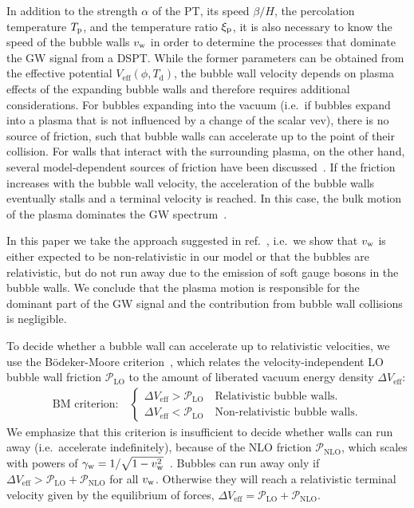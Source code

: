 In addition to the strength $\alpha$ of the \ac{PT}, its speed $\beta/H$, the percolation temperature $T_{\text{p}}$, and the temperature ratio $\xi_{\text{p}}$, it is also necessary to know the speed of the bubble walls $v_\mathrm{w}$ in order to determine the processes that dominate the \ac{GW} signal from a \ac{DSPT}. While the former parameters can be obtained from the effective potential $V_\text{eff}(\phi, T_\text{d})$, the bubble wall velocity depends on plasma effects of the expanding bubble walls and therefore requires additional considerations. For bubbles expanding into the vacuum (i.e.~if bubbles expand into a plasma that is not influenced by a change of the scalar \ac{vev}), there is no source of friction, such that bubble walls can accelerate up to the point of  their collision. For walls that interact with the surrounding plasma, on the other hand, several model-dependent sources of friction have been discussed~\cite{Liu:1992tn, Bodeker:2009qy, Bodeker:2017cim, Azatov:2020ufh, GarciaGarcia:2022yqb}. If the friction increases with the bubble wall velocity, the acceleration of the bubble walls eventually stalls and a terminal velocity
is reached. In this case, the bulk motion of the plasma dominates the \ac{GW} spectrum~\cite{Azatov:2023xem}.

In this paper we take the approach suggested in ref.~\cite{Vanvlasselaer:2022fqf}, i.e.~we show that $v_\mathrm{w}$ is either expected to be non-relativistic in our model or that the bubbles are  relativistic, but do not run away due to the emission of soft gauge bosons in the bubble walls. We conclude that the plasma motion is responsible for the dominant part of the \ac{GW} signal and the contribution from bubble wall collisions is negligible.

To decide whether a bubble wall can accelerate up to  relativistic velocities, we use the Bödeker-Moore criterion~\cite{Bodeker:2009qy}, which relates the velocity-independent \acf{LO} bubble wall friction $\mathcal{P}_\mathrm{LO}$ to the amount of liberated vacuum
energy density $\Delta V_\text{eff}$:
\begin{align}
	\text{BM criterion:} \quad \begin{cases}
		\Delta V_\text{eff} > \mathcal{P}_\mathrm{LO} \quad \text{Relativistic bubble walls.} \\
		\Delta V_\text{eff} < \mathcal{P}_\mathrm{LO} \quad \text{Non-relativistic bubble walls.} \label{eq:Bodeker}
	\end{cases}
\end{align}
We emphasize that this criterion is insufficient to decide whether walls can run away (i.e.~accelerate indefinitely), because of the \ac{NLO} friction $\mathcal{P}_\mathrm{NLO}$, which scales with powers of $\gamma_\text{w} = 1/\sqrt{1 - v_\mathrm{w}^2}$~\cite{Bodeker:2017cim,Hoche:2020ysm,Gouttenoire:2021kjv}. Bubbles can run away only if $\Delta V_\text{eff} > \mathcal{P}_\mathrm{LO} + \mathcal{P}_\mathrm{NLO}$ for all $v_\mathrm{w}$. Otherwise they will reach a relativistic terminal velocity given by the equilibrium of forces, $\Delta V_\text{eff} = \mathcal{P}_\mathrm{LO} + \mathcal{P}_\mathrm{NLO}$.


